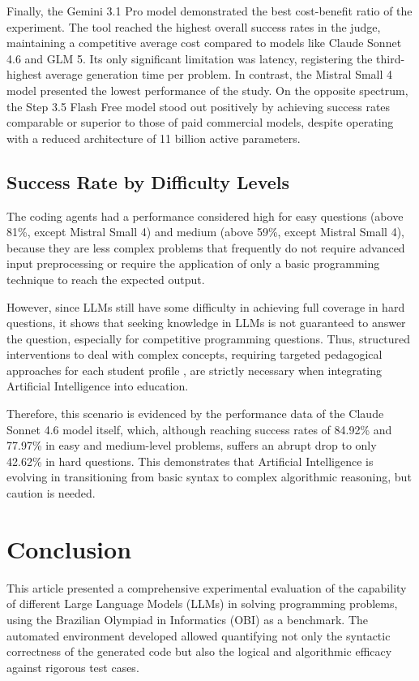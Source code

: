 \documentclass[conference]{IEEEtran}
\begin{document}
Finally, the Gemini 3.1 Pro model demonstrated the best cost-benefit ratio of the experiment. The tool reached the highest overall success rates in the judge, maintaining a competitive average cost compared to models like Claude Sonnet 4.6 and GLM 5. Its only significant limitation was latency, registering the third-highest average generation time per problem. In contrast, the Mistral Small 4 model presented the lowest performance of the study. On the opposite spectrum, the Step 3.5 Flash Free model stood out positively by achieving success rates comparable or superior to those of paid commercial models, despite operating with a reduced architecture of 11 billion active parameters.

\subsection{Success Rate by Difficulty Levels}\label{subsec:success}

The coding agents had a performance considered high for easy questions (above 81\%, except Mistral Small 4) and medium (above 59\%, except Mistral Small 4), because they are less complex problems that frequently do not require advanced input preprocessing or require the application of only a basic programming technique to reach the expected output.

However, since LLMs still have some difficulty in achieving full coverage in hard questions, it shows that seeking knowledge in LLMs is not guaranteed to answer the question, especially for competitive programming questions. Thus, structured interventions to deal with complex concepts, requiring targeted pedagogical approaches for each student profile \cite{baist2017analysis}, are strictly necessary when integrating Artificial Intelligence into education.

Therefore, this scenario is evidenced by the performance data of the Claude Sonnet 4.6 model itself, which, although reaching success rates of 84.92\% and 77.97\% in easy and medium-level problems, suffers an abrupt drop to only 42.62\% in hard questions. This demonstrates that Artificial Intelligence is evolving in transitioning from basic syntax to complex algorithmic reasoning, but caution is needed.

\section{Conclusion}\label{sec:conclusion}

This article presented a comprehensive experimental evaluation of the capability of different Large Language Models (LLMs) in solving programming problems, using the Brazilian Olympiad in Informatics (OBI) as a benchmark. The automated environment developed allowed quantifying not only the syntactic correctness of the generated code but also the logical and algorithmic efficacy against rigorous test cases.
\end{document}
